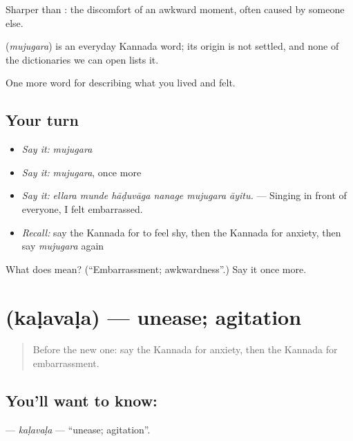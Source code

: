 Sharper than : the discomfort of an awkward moment, often caused by someone else.

\begin{cousinweb}
\textbf{} (\emph{mujugara}) is an everyday Kannada word; its origin is not settled, and none of the dictionaries we can open lists it.
\end{cousinweb}

\begin{grammarlens}[title={What you've built}]
One more word for describing what you lived and felt.
\end{grammarlens}

\subsection*{Your turn}
\begin{itemize}
\raggedright
  \item \emph{Say it:} \emph{mujugara}
  \item \emph{Say it:} \emph{mujugara}, once more
  \item \emph{Say it:} \emph{ellara munde hāḍuvāga nanage mujugara āyitu.} — Singing in front of everyone, I felt embarrassed.
  \item \emph{Recall:} say the Kannada for to feel shy, then the Kannada for anxiety, then say \emph{mujugara} again
\end{itemize}

\begin{tcolorbox}[breakable,colback=teal!4,colframe=teal!35!black,title={Before you move on}]
What does  mean? (\textquotedblleft{}Embarrassment; awkwardness\textquotedblright{}.) Say it once more.
\end{tcolorbox}
\section[\texorpdfstring{\kn{ಕಳವಳ} (kaḷavaḷa)}{ಕಳವಳ (kaḷavaḷa)}]{ (kaḷavaḷa) — unease; agitation}

\label{lesson:KA-C490-kalavala}



\begin{quote}
Before the new one: say the Kannada for anxiety, then the Kannada for embarrassment.
\end{quote}

\subsection*{You'll want to know: }
\textbf{} — \emph{kaḷavaḷa} — \textquotedblleft{}unease; agitation\textquotedblright{}.

